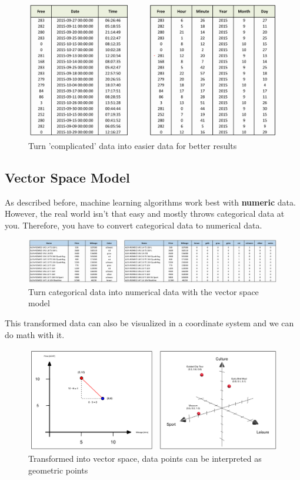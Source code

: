 \documentclass[a4paper, 11pt]{article}
\begin{document}
\begin{figure}[htb!]
    \centering
    \includegraphics[keepaspectratio=true, width=\linewidth]{feature_engineering.png}
    \caption{Turn 'complicated' data into easier data for better results}
    \label{fig:feature_engineering}
\end{figure}

\subsection{Vector Space Model}

As described before, machine learning algorithms work best with \textbf{numeric} data. However, the real world isn't that easy and mostly throws categorical data at you. Therefore, you have to convert categorical data to numerical data. 

\begin{figure}[htb!]
    \centering
    \includegraphics[keepaspectratio=true, width=\linewidth]{vector_space_model.png}
    \caption{Turn categorical data into numerical data with the vector space model}
    \label{fig:vector_space_modefig}
\end{figure}

This transformed data can also be visualized in a coordinate system and we can do math with it.

\begin{figure}[htb!]
    \centering
    \includegraphics[keepaspectratio=true, width=\linewidth]{geometric_interpretation.png}
    \caption{Transformed into vector space, data points can be interpreted as geometric points}
    \label{fig:geometric_intepretation}
\end{figure}
\end{document}
